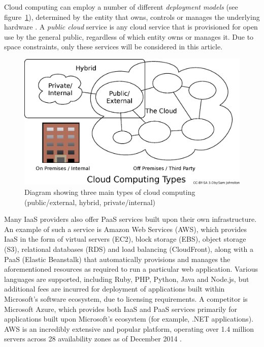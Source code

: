 \documentclass[a4paper]{proc}
\begin{document}
  Cloud computing can employ a number of different \emph{deployment models} (see figure~\ref{fig:cloud_computing_types}), determined by the entity that owns, controls or manages the underlying hardware \cite{Mell2011}. A \emph{public cloud} service is any cloud service that is provisioned for open use by the general public, regardless of which entity owns or manages it. Due to space constraints, only these services will be considered in this article.

  \begin{figure}
    \centering
    \includegraphics[width=\columnwidth]{figures/Cloud_computing_types.eps}
    \caption{Diagram showing three main types of cloud computing (public/external, hybrid, private/internal) \cite{Joton2009}}
    \label{fig:cloud_computing_types}
  \end{figure}

  Many IaaS providers also offer PaaS services built upon their own infrastructure. An example of such a service is Amazon Web Services (AWS), which provides IaaS in the form of virtual servers (EC2), block storage (EBS), object storage (S3), relational databases (RDS) and load balancing (CloudFront), along with a PaaS (Elastic Beanstalk) that automatically provisions and manages the aforementioned resources as required to run a particular web application. Various languages are supported, including Ruby, PHP, Python, Java and Node.js, but additional fees are incurred for deployment of applications built within Microsoft's software ecosystem, due to licensing requirements. A competitor is Microsoft Azure, which provides both IaaS and PaaS services primarily for applications built upon Microsoft's ecosystem (for example, .NET applications). AWS is an incredibly extensive and popular platform, operating over 1.4 million servers across 28 availability zones as of December 2014 \cite{Mathews2014}.
\end{document}
